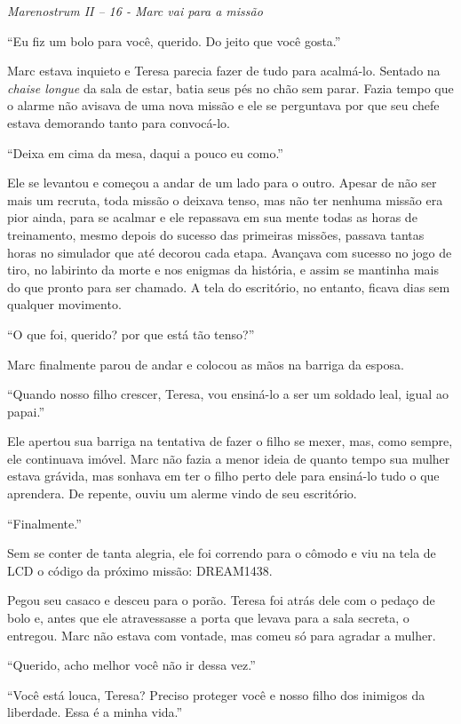 \asterisc

\emph{Marenostrum II -- 16 - Marc vai para a missão}

``Eu fiz um bolo para você, querido. Do jeito que você gosta.''

Marc estava inquieto e Teresa parecia fazer de tudo para acalmá-lo.
Sentado na \emph{chaise longue} da sala de estar, batia seus pés no chão
sem parar. Fazia tempo que o alarme não avisava de uma nova missão e ele
se perguntava por que seu chefe estava demorando tanto para convocá-lo.

``Deixa em cima da mesa, daqui a pouco eu como.''

Ele se levantou e começou a andar de um lado para o outro. Apesar de não
ser mais um recruta, toda missão o deixava tenso, mas não ter nenhuma
missão era pior ainda, para se acalmar e ele repassava em sua mente
todas as horas de treinamento, mesmo depois do sucesso das primeiras
missões, passava tantas horas no simulador que até decorou cada etapa.
Avançava com sucesso no jogo de tiro, no labirinto da morte e nos
enigmas da história, e assim se mantinha mais do que pronto para ser
chamado. A tela do escritório, no entanto, ficava dias sem qualquer
movimento.

``O que foi, querido? por que está tão tenso?''

Marc finalmente parou de andar e colocou as mãos na barriga da esposa.

``Quando nosso filho crescer, Teresa, vou ensiná-lo a ser um soldado
leal, igual ao papai.''

Ele apertou sua barriga na tentativa de fazer o filho se mexer, mas,
como sempre, ele continuava imóvel. Marc não fazia a menor ideia de
quanto tempo sua mulher estava grávida, mas sonhava em ter o filho perto
dele para ensiná-lo tudo o que aprendera. De repente, ouviu um alerme
vindo de seu escritório.

``Finalmente.''

Sem se conter de tanta alegria, ele foi correndo para o cômodo e viu na
tela de LCD o código da próximo missão: DREAM1438.

Pegou seu casaco e desceu para o porão. Teresa foi atrás dele com o
pedaço de bolo e, antes que ele atravessasse a porta que levava para a
sala secreta, o entregou. Marc não estava com vontade, mas comeu só para
agradar a mulher.

``Querido, acho melhor você não ir dessa vez.''

``Você está louca, Teresa? Preciso proteger você e nosso filho dos
inimigos da liberdade. Essa é a minha vida.''

